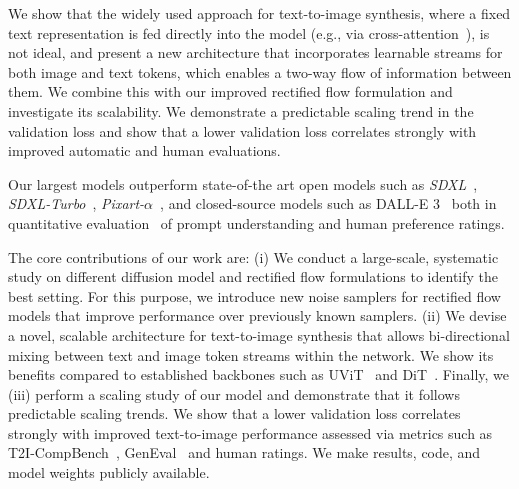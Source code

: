 We show that the widely used approach for text-to-image synthesis, where a fixed text representation is fed directly into the model (e.g., via cross-attention~\citep{vaswani2017attention, Rombach_2022}), is not ideal, and present a new architecture that incorporates learnable streams for both image and text tokens, which enables a two-way flow of information between them. 
We combine this with our improved rectified flow formulation and investigate its scalability. 
We demonstrate a predictable scaling trend in the validation loss and show that a lower validation loss correlates strongly with improved automatic and human evaluations.

Our largest models outperform state-of-the art open models such as \emph{SDXL}~\citep{podell2023sdxl},  \emph{SDXL-Turbo}~\citep{sauer2023adversarial}, \emph{Pixart-$\alpha$}~\citep{chen2023pixart}, and closed-source models such as DALL-E 3~\citep{betker2023improving} both in quantitative evaluation~\citep{ghosh2023geneval} of prompt understanding and human preference ratings.

The core contributions of our work are: 
(i) We conduct a large-scale, systematic study on different diffusion model and rectified flow formulations to identify the best setting. For this purpose, we introduce new noise samplers for rectified flow models that improve performance over previously known samplers. %
(ii) We devise a novel, scalable architecture for text-to-image synthesis that allows bi-directional mixing between text and image token streams within the network. We show its benefits compared to established backbones such as UViT~\citep{hoogeboom2023simple} and DiT~\citep{Peebles_2023}. 
Finally, we (iii) perform a scaling study of our model and demonstrate that it follows predictable scaling trends. We show that a lower validation loss correlates strongly with improved text-to-image performance assessed via metrics such as T2I-CompBench~\citep{huang2023t2i}, GenEval~\citep{ghosh2023geneval} and human ratings.
%
%
We make results, code, and model weights publicly available.
\vspace{-1em}
%
%
%
%
%
%

%

%

%

%

%


%

%

%
%



%

%
%
%
%
%
%
%
%
%



%

%

%

%
%
%
%
%
%
%




%

